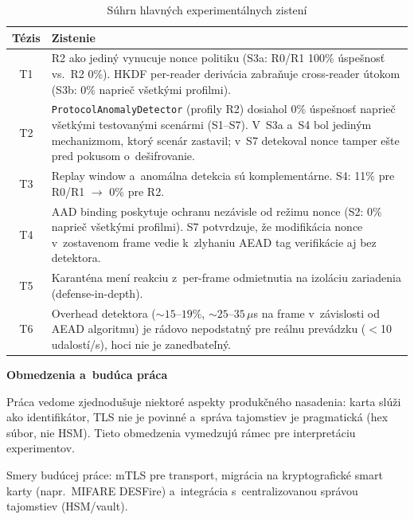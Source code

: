 \begin{table}[H]
\renewcommand{\arraystretch}{1.3}
\centering
\caption{Súhrn hlavných experimentálnych zistení}
\label{tab:findings}
\small
\begin{tabular}{c p{10.5cm}}
\toprule
\textbf{Tézis} & \textbf{Zistenie} \\
\midrule
T1 & R2 ako jediný vynucuje nonce politiku (S3a: R0/R1 100\% úspešnosť vs.\ R2 0\%). HKDF per-reader derivácia zabraňuje cross-reader útokom (S3b: 0\% naprieč všetkými profilmi). \\
T2 & \texttt{ProtocolAnomalyDetector} (profily R2) dosiahol 0\% úspešnosť naprieč všetkými testovanými scenármi (S1--S7). V~S3a a~S4 bol jediným mechanizmom, ktorý scenár zastavil; v~S7 detekoval nonce tamper ešte pred pokusom o~dešifrovanie. \\
T3 & Replay window a~anomálna detekcia sú komplementárne. S4: 11\% pre R0/R1 $\rightarrow$ 0\% pre R2. \\
T4 & AAD binding poskytuje ochranu nezávisle od režimu nonce (S2: 0\% naprieč všetkými profilmi). S7 potvrdzuje, že modifikácia nonce v~zostavenom frame vedie k~zlyhaniu AEAD tag verifikácie aj bez detektora. \\
T5 & Karanténa mení reakciu z~per-frame odmietnutia na izoláciu zariadenia (defense-in-depth). \\
T6 & Overhead detektora (${\sim}15$--$19\%$, ${\sim}25$--$35\,\mu$s na frame v~závislosti od AEAD algoritmu) je rádovo nepodstatný pre reálnu prevádzku ($<$10 udalostí/s), hoci nie je zanedbateľný. \\
\bottomrule
\end{tabular}
\end{table}

\noindent\textbf{Obmedzenia a~budúca práca}

Práca vedome zjednodušuje niektoré aspekty produkčného nasadenia: karta slúži ako identifikátor, TLS nie je povinné a~správa tajomstiev je pragmatická (hex súbor, nie HSM). Tieto obmedzenia vymedzujú rámec pre interpretáciu experimentov.

Smery budúcej práce: mTLS\cite{RFC8446} pre transport, migrácia na kryptografické smart karty (napr.\ MIFARE DESFire\cite{GarciaMIFARE2008}) a~integrácia s~centralizovanou správou tajomstiev (HSM/vault)\cite{NIST80057}.
